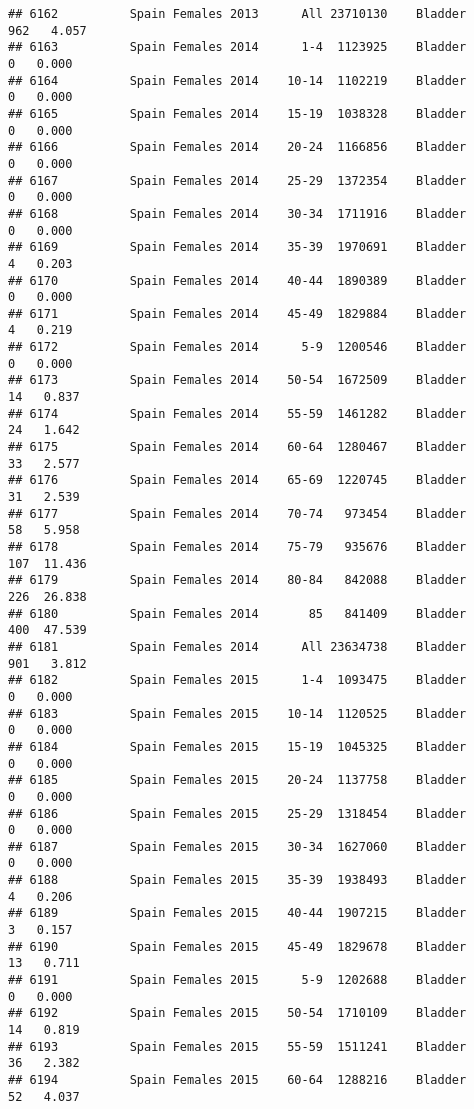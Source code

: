 \documentclass[
]{article}
\begin{document}
\begin{verbatim}
## 6162          Spain Females 2013      All 23710130    Bladder    962   4.057
## 6163          Spain Females 2014      1-4  1123925    Bladder      0   0.000
## 6164          Spain Females 2014    10-14  1102219    Bladder      0   0.000
## 6165          Spain Females 2014    15-19  1038328    Bladder      0   0.000
## 6166          Spain Females 2014    20-24  1166856    Bladder      0   0.000
## 6167          Spain Females 2014    25-29  1372354    Bladder      0   0.000
## 6168          Spain Females 2014    30-34  1711916    Bladder      0   0.000
## 6169          Spain Females 2014    35-39  1970691    Bladder      4   0.203
## 6170          Spain Females 2014    40-44  1890389    Bladder      0   0.000
## 6171          Spain Females 2014    45-49  1829884    Bladder      4   0.219
## 6172          Spain Females 2014      5-9  1200546    Bladder      0   0.000
## 6173          Spain Females 2014    50-54  1672509    Bladder     14   0.837
## 6174          Spain Females 2014    55-59  1461282    Bladder     24   1.642
## 6175          Spain Females 2014    60-64  1280467    Bladder     33   2.577
## 6176          Spain Females 2014    65-69  1220745    Bladder     31   2.539
## 6177          Spain Females 2014    70-74   973454    Bladder     58   5.958
## 6178          Spain Females 2014    75-79   935676    Bladder    107  11.436
## 6179          Spain Females 2014    80-84   842088    Bladder    226  26.838
## 6180          Spain Females 2014       85   841409    Bladder    400  47.539
## 6181          Spain Females 2014      All 23634738    Bladder    901   3.812
## 6182          Spain Females 2015      1-4  1093475    Bladder      0   0.000
## 6183          Spain Females 2015    10-14  1120525    Bladder      0   0.000
## 6184          Spain Females 2015    15-19  1045325    Bladder      0   0.000
## 6185          Spain Females 2015    20-24  1137758    Bladder      0   0.000
## 6186          Spain Females 2015    25-29  1318454    Bladder      0   0.000
## 6187          Spain Females 2015    30-34  1627060    Bladder      0   0.000
## 6188          Spain Females 2015    35-39  1938493    Bladder      4   0.206
## 6189          Spain Females 2015    40-44  1907215    Bladder      3   0.157
## 6190          Spain Females 2015    45-49  1829678    Bladder     13   0.711
## 6191          Spain Females 2015      5-9  1202688    Bladder      0   0.000
## 6192          Spain Females 2015    50-54  1710109    Bladder     14   0.819
## 6193          Spain Females 2015    55-59  1511241    Bladder     36   2.382
## 6194          Spain Females 2015    60-64  1288216    Bladder     52   4.037

\end{verbatim}
\end{document}
